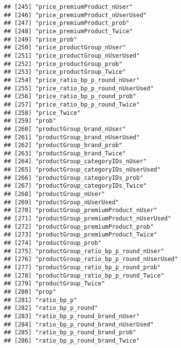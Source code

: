 \documentclass[10pt]{report}
\begin{document}
\begin{verbatim}
## [245] "price_premiumProduct_nUser"                         
## [246] "price_premiumProduct_nUserUsed"                     
## [247] "price_premiumProduct_prob"                          
## [248] "price_premiumProduct_Twice"                         
## [249] "price_prob"                                         
## [250] "price_productGroup_nUser"                           
## [251] "price_productGroup_nUserUsed"                       
## [252] "price_productGroup_prob"                            
## [253] "price_productGroup_Twice"                           
## [254] "price_ratio_bp_p_round_nUser"                       
## [255] "price_ratio_bp_p_round_nUserUsed"                   
## [256] "price_ratio_bp_p_round_prob"                        
## [257] "price_ratio_bp_p_round_Twice"                       
## [258] "price_Twice"                                        
## [259] "prob"                                               
## [260] "productGroup_brand_nUser"                           
## [261] "productGroup_brand_nUserUsed"                       
## [262] "productGroup_brand_prob"                            
## [263] "productGroup_brand_Twice"                           
## [264] "productGroup_categoryIDs_nUser"                     
## [265] "productGroup_categoryIDs_nUserUsed"                 
## [266] "productGroup_categoryIDs_prob"                      
## [267] "productGroup_categoryIDs_Twice"                     
## [268] "productGroup_nUser"                                 
## [269] "productGroup_nUserUsed"                             
## [270] "productGroup_premiumProduct_nUser"                  
## [271] "productGroup_premiumProduct_nUserUsed"              
## [272] "productGroup_premiumProduct_prob"                   
## [273] "productGroup_premiumProduct_Twice"                  
## [274] "productGroup_prob"                                  
## [275] "productGroup_ratio_bp_p_round_nUser"                
## [276] "productGroup_ratio_bp_p_round_nUserUsed"            
## [277] "productGroup_ratio_bp_p_round_prob"                 
## [278] "productGroup_ratio_bp_p_round_Twice"                
## [279] "productGroup_Twice"                                 
## [280] "prop"                                               
## [281] "ratio_bp_p"                                         
## [282] "ratio_bp_p_round"                                   
## [283] "ratio_bp_p_round_brand_nUser"                       
## [284] "ratio_bp_p_round_brand_nUserUsed"                   
## [285] "ratio_bp_p_round_brand_prob"                        
## [286] "ratio_bp_p_round_brand_Twice"                       

\end{verbatim}
\end{document}

